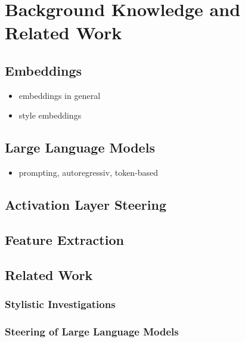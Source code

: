 \chapter{Background Knowledge and Related Work}
\label{sec:relatedWork_backgroundKnowledge}
\section{Embeddings}
\label{sec:relatedWork_backgroundKnowledge:embeddings}
\begin{itemize}
  \item embeddings in general
  \item style embeddings
\end{itemize}


\section{Large Language Models}
\label{sec:relatedWork_backgroundKnowledge:llm}
\begin{itemize}
  \item prompting, autoregressiv, token-based
\end{itemize}


\section{Activation Layer Steering}
\label{sec:relatedWork_backgroundKnowledge:activation}

\section{Feature Extraction}


\section{Related Work}


\subsection{Stylistic Investigations} %


\subsection{Steering of Large Language Models}